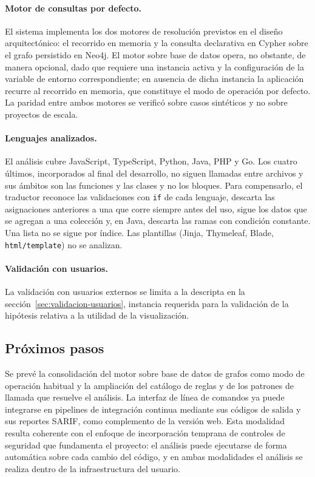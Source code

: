 \paragraph{Motor de consultas por defecto.} El sistema implementa los dos motores de resolución previstos en el diseño arquitectónico: el recorrido en memoria y la consulta declarativa en Cypher sobre el grafo persistido en Neo4j. El motor sobre base de datos opera, no obstante, de manera opcional, dado que requiere una instancia activa y la configuración de la variable de entorno correspondiente; en ausencia de dicha instancia la aplicación recurre al recorrido en memoria, que constituye el modo de operación por defecto. La paridad entre ambos motores se verificó sobre casos sintéticos y no sobre proyectos de escala.

\paragraph{Lenguajes analizados.} El análisis cubre JavaScript, TypeScript, Python, Java, PHP y Go. Los cuatro últimos, incorporados al final del desarrollo, no siguen llamadas entre archivos y sus ámbitos son las funciones y las clases y no los bloques. Para compensarlo, el traductor reconoce las validaciones con \texttt{if} de cada lenguaje, descarta las asignaciones anteriores a una que corre siempre antes del uso, sigue los datos que se agregan a una colección y, en Java, descarta las ramas con condición constante. Una lista no se sigue por índice. Las plantillas (Jinja, Thymeleaf, Blade, \texttt{html/template}) no se analizan.

\paragraph{Validación con usuarios.} La validación con usuarios externos se limita a la descripta en la sección~\ref{sec:validacion-usuarios}, instancia requerida para la validación de la hipótesis relativa a la utilidad de la visualización.

\subsection{Próximos pasos}\label{sec:n4.2.6}

Se prevé la consolidación del motor sobre base de datos de grafos como modo de operación habitual y la ampliación del catálogo de reglas y de los patrones de llamada que resuelve el análisis. La interfaz de línea de comandos ya puede integrarse en pipelines de integración continua mediante sus códigos de salida y sus reportes SARIF, como complemento de la versión web. Esta modalidad resulta coherente con el enfoque de incorporación temprana de controles de seguridad que fundamenta el proyecto: el análisis puede ejecutarse de forma automática sobre cada cambio del código, y en ambas modalidades el análisis se realiza dentro de la infraestructura del usuario.

